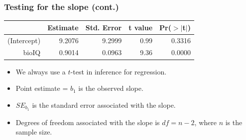 \documentclass[slidestop,compress,mathserif]{beamer}
\begin{document}

\begin{frame}
\frametitle{Testing for the slope (cont.)}

{\footnotesize
\begin{center}
\begin{tabular}{rrrrr}
  \hline
 & Estimate & Std. Error & t value & Pr($>$$|$t$|$) \\ 
  \hline
(Intercept) & 9.2076 & 9.2999 & 0.99 & 0.3316 \\ 
  bioIQ & 0.9014 & 0.0963 & 9.36 & 0.0000 \\ 
   \hline
\end{tabular}
\end{center}
}

\pause

\begin{itemize}

\item We always use a $t$-test in inference for regression. $\:$ \\

\pause


\pause

\item Point estimate = $b_1$ is the observed slope.

\pause

\item $SE_{b_1}$ is the standard error associated with the slope.

\pause

\item Degrees of freedom associated with the slope is $df = n - 2$, where $n$ is the sample size. $\:$ \\
\pause
{}

\end{itemize}

\end{frame}

\end{document}
